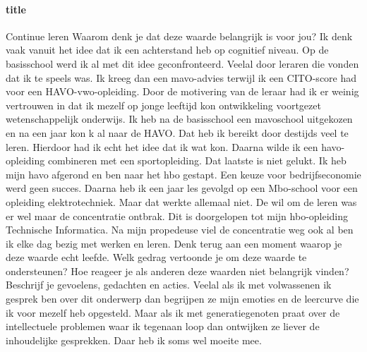 \documentclass[11pt]{report}
\begin{document}
\paragraph{title}
Continue leren
Waarom denk je dat deze waarde belangrijk is voor jou?
Ik denk vaak vanuit het idee dat ik een achterstand heb op cognitief niveau. Op de basisschool werd ik al met dit idee geconfronteerd. Veelal door leraren die vonden dat ik te speels was. Ik kreeg dan een mavo-advies terwijl ik een CITO-score had voor een HAVO-vwo-opleiding. Door de motivering van de leraar had ik er weinig vertrouwen in dat ik mezelf op jonge leeftijd kon ontwikkeling voortgezet wetenschappelijk onderwijs.
Ik heb na de basisschool een mavoschool uitgekozen en na een jaar kon k al naar de HAVO. Dat heb ik bereikt door destijds veel te leren. Hierdoor had ik echt het idee dat ik wat kon. Daarna wilde ik een havo-opleiding combineren met een sportopleiding. Dat laatste is niet gelukt. Ik heb mijn havo afgerond en ben naar het hbo gestapt. Een keuze voor bedrijfseconomie werd geen succes. Daarna heb ik een jaar les gevolgd op een Mbo-school voor een opleiding elektrotechniek. Maar dat werkte allemaal niet. De wil om de leren was er wel maar de concentratie ontbrak. Dit is doorgelopen tot mijn hbo-opleiding Technische Informatica. Na mijn propedeuse viel de concentratie weg ook al ben ik elke dag bezig met werken en leren.
Denk terug aan een moment waarop je deze waarde echt leefde. Welk gedrag vertoonde je om deze waarde te ondersteunen? 
Hoe reageer je als anderen deze waarden niet belangrijk vinden? Beschrijf je gevoelens, gedachten en acties. Veelal als ik met volwassenen ik gesprek ben over dit onderwerp dan begrijpen ze mijn emoties en de leercurve die ik voor mezelf heb opgesteld. Maar als ik met generatiegenoten praat over de intellectuele problemen waar ik tegenaan loop dan ontwijken ze liever de inhoudelijke gesprekken. Daar heb ik soms wel moeite mee.
\end{document}
